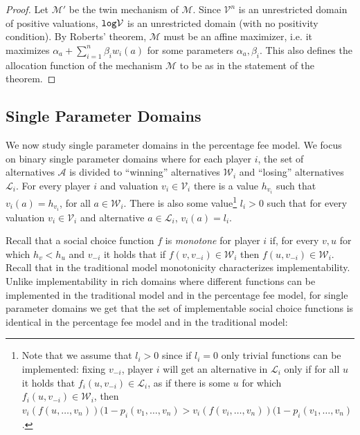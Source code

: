 \documentclass{article}
\newcommand{\cM}{{\mathcal M}}
\newcommand{\cV}{{\mathcal V}}
\begin{document}
\begin{proof}
Let $\cM'$ be the twin mechanism of $\cM$.  Since $\cV^n$ is an unrestricted domain of positive valuations, ${\tt log }\cV$ is an unrestricted domain (with no positivity condition). By Roberts' theorem, $\cM$ must be an affine maximizer, i.e. it maximizes $\alpha_a + \sum_{i=1}^{n} \beta_i w_i(a)$ for some parameters $\alpha_a, \beta_i$. This also defines the allocation function of the mechanism $\cM$ to be as in the statement of the theorem.
\end{proof}


\subsection{Single Parameter Domains}\label{subsec-single-parameter}

We now study single parameter domains in the percentage fee model. We focus on binary single parameter domains where for each player $i$, the set of alternatives $\mathcal A$ is divided to ``winning'' alternatives $\mathcal W_i$ and ``losing'' alternatives $\mathcal L_i$. For every player $i$ and valuation $v_i\in \mathcal V_i$ there is a value $h_{v_i}$ such that $v_i(a)=h_{v_i}$, for all $a\in \mathcal W_i$. There is also some value\footnote{Note that we assume that $l_i>0$ since if $l_i=0$ only trivial functions can be implemented: fixing $v_{-i}$, player $i$ will get an alternative in $\mathcal L_i$ only if for all $u$ it holds that $f_i(u,v_{-i})\in \mathcal L_i$, as if there is some $u$ for which $f_i(u,v_{-i})\in \mathcal W_i$, then $v_i(f(u,\ldots, v_n))(1-p_i(v_1,\ldots,v_n)>v_i(f(v_i,\ldots, v_n))(1-p_i(v_1,\ldots,v_n)$.} $l_i>0$ such that for every valuation $v_i\in \mathcal V_i$ and alternative $a\in \mathcal L_i$, $v_i(a)=l_i$.

Recall that a social choice function $f$ is \emph{monotone} for player $i$ if, for every $v,u$ for which $h_v<h_u$ and $v_{-i}$ it holds that if $f(v,v_{-i})\in \mathcal W_i$ then $f(u,v_{-i})\in \mathcal W_i$. Recall that in the traditional model monotonicity characterizes implementability. Unlike implementability in rich domains where different functions can be implemented in the traditional model and in the percentage fee model, for single parameter domains we get that the set of implementable social choice functions is identical in the percentage fee model and in the traditional model:
\end{document}
